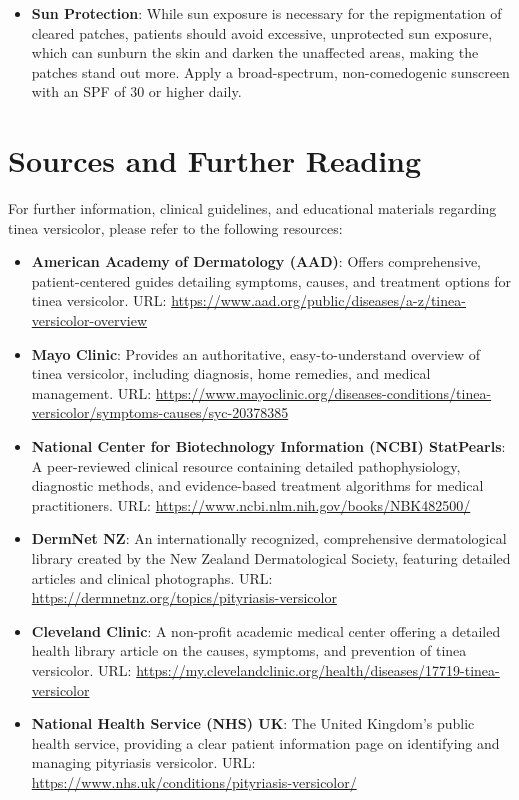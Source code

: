 \begin{itemize}
\begin{itemize}
        \item Change out of damp or sweaty clothing as soon as possible after working out, playing sports, or performing physical labor.
        \item Maintain a cool, dry home environment using air conditioning or dehumidifiers, particularly in bedrooms, to minimize sweating during sleep.
    \end{itemize}
    \item \textbf{Sun Protection}: While sun exposure is necessary for the repigmentation of cleared patches, patients should avoid excessive, unprotected sun exposure, which can sunburn the skin and darken the unaffected areas, making the patches stand out more. Apply a broad-spectrum, non-comedogenic sunscreen with an SPF of 30 or higher daily.
\end{itemize}

\section*{Sources and Further Reading}
For further information, clinical guidelines, and educational materials regarding tinea versicolor, please refer to the following resources:

\begin{itemize}
    \item \textbf{American Academy of Dermatology (AAD)}: Offers comprehensive, patient-centered guides detailing symptoms, causes, and treatment options for tinea versicolor. URL: \url{https://www.aad.org/public/diseases/a-z/tinea-versicolor-overview}
    \item \textbf{Mayo Clinic}: Provides an authoritative, easy-to-understand overview of tinea versicolor, including diagnosis, home remedies, and medical management. URL: \url{https://www.mayoclinic.org/diseases-conditions/tinea-versicolor/symptoms-causes/syc-20378385}
    \item \textbf{National Center for Biotechnology Information (NCBI) StatPearls}: A peer-reviewed clinical resource containing detailed pathophysiology, diagnostic methods, and evidence-based treatment algorithms for medical practitioners. URL: \url{https://www.ncbi.nlm.nih.gov/books/NBK482500/}
    \item \textbf{DermNet NZ}: An internationally recognized, comprehensive dermatological library created by the New Zealand Dermatological Society, featuring detailed articles and clinical photographs. URL: \url{https://dermnetnz.org/topics/pityriasis-versicolor}
    \item \textbf{Cleveland Clinic}: A non-profit academic medical center offering a detailed health library article on the causes, symptoms, and prevention of tinea versicolor. URL: \url{https://my.clevelandclinic.org/health/diseases/17719-tinea-versicolor}
    \item \textbf{National Health Service (NHS) UK}: The United Kingdom's public health service, providing a clear patient information page on identifying and managing pityriasis versicolor. URL: \url{https://www.nhs.uk/conditions/pityriasis-versicolor/}
\end{itemize}